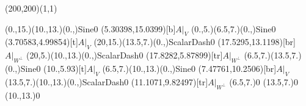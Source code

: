 \unitlength=1bp%

\begin{feynartspicture}(200,200)(1,1)

\FADiagram{}
\FAProp(0.,15.)(10.,13.)(0.,){Sine}{0}
\FALabel(5.30398,15.0399)[b]{$A|_V$}
\FAProp(0.,5.)(6.5,7.)(0.,){Sine}{0}
\FALabel(3.70583,4.99854)[t]{$A|_V$}
\FAProp(20,15.)(13.5,7.)(0.,){ScalarDash}{0}
\FALabel(17.5295,13.1198)[br]{$A|_{W^\perp}$}
\FAProp(20,5.)(10.,13.)(0.,){ScalarDash}{0}
\FALabel(17.8282,5.87899)[tr]{$A|_{W^\perp}$}
\FAProp(6.5,7.)(13.5,7.)(0.,){Sine}{0}
\FALabel(10.,5.93)[t]{$A|_V$}
\FAProp(6.5,7.)(10.,13.)(0.,){Sine}{0}
\FALabel(7.47761,10.2506)[br]{$A|_V$}
\FAProp(13.5,7.)(10.,13.)(0.,){ScalarDash}{0}
\FALabel(11.1071,9.82497)[tr]{$A|_{W^\perp}$}
\FAVert(6.5,7.){0}
\FAVert(13.5,7.){0}
\FAVert(10.,13.){0}
\end{feynartspicture}

